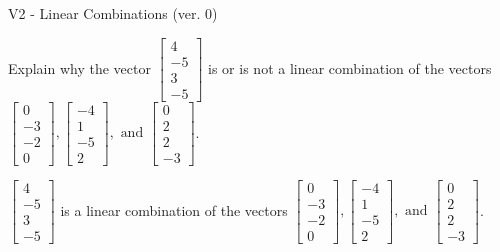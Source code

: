 \begin{exercise}
  \begin{exerciseTitle}V2 - Linear Combinations (ver. 0)\end{exerciseTitle}
  \begin{exerciseStatement}
    Explain why the vector \(\left[\begin{array}{c}
4 \\
-5 \\
3 \\
-5
\end{array}\right]\)  is or is not a linear 
	combination of the vectors \(\left[\begin{array}{c}
0 \\
-3 \\
-2 \\
0
\end{array}\right] , \left[\begin{array}{c}
-4 \\
1 \\
-5 \\
2
\end{array}\right] , \text{ and } \left[\begin{array}{c}
0 \\
2 \\
2 \\
-3
\end{array}\right]\).
	


  \end{exerciseStatement}
  \begin{exerciseAnswer}
   \(\left[\begin{array}{c}
4 \\
-5 \\
3 \\
-5
\end{array}\right]\) 
  	 is  
	a linear combination of the vectors \(\left[\begin{array}{c}
0 \\
-3 \\
-2 \\
0
\end{array}\right] , \left[\begin{array}{c}
-4 \\
1 \\
-5 \\
2
\end{array}\right] , \text{ and } \left[\begin{array}{c}
0 \\
2 \\
2 \\
-3
\end{array}\right]\).

	
  


  \end{exerciseAnswer}
\end{exercise}